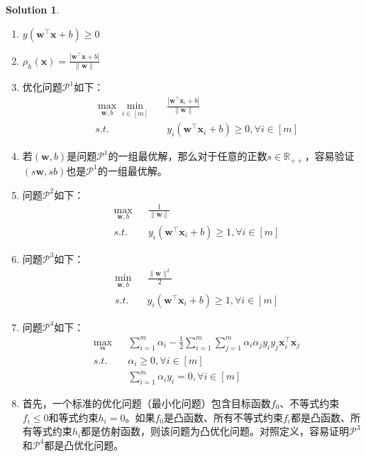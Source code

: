 \documentclass[a4paper,UTF8]{article}
\theoremstyle{definition}
\newtheorem*{solution}{Solution}
\begin{document}
\begin{solution}
\begin{enumerate}[(1)]
\item $y(\mathbf{w}^\top\mathbf{x}+b)\geq 0$
\item $\rho_{h}(\mathbf{x})=\frac{|\mathbf{w}^\top\mathbf{x}+b|}{\|\mathbf{w}\|}$
\item 优化问题$\mathcal{P}^{1}$如下：
\begin{equation}
\begin{aligned}
&\max_{\mathbf{w},b}\min_{i\in[m]}&&\frac{|\mathbf{w}^\top\mathbf{x}_i+b|}{\|\mathbf{w}\|}\\
&s.t.&&y_i(\mathbf{w}^\top\mathbf{x}_i+b)\geq 0,\forall i\in[m]
\end{aligned}
\end{equation}
\item 若$(\mathbf{w},b)$是问题$\mathcal{P}^{1}$的一组最优解，那么对于任意的正数$s\in\mathbb{R}_{++}$，容易验证$(s\mathbf{w},sb)$也是$\mathcal{P}^{1}$的一组最优解。
\item 问题$\mathcal{P}^{2}$如下：
\begin{equation}
\begin{aligned}
&\max_{\mathbf{w},b}&&\frac{1}{\|\mathbf{w}\|}\\
&s.t.&&y_i(\mathbf{w}^\top\mathbf{x}_i+b)\geq 1,\forall i\in[m]
\end{aligned}
\end{equation}
\item 问题$\mathcal{P}^{3}$如下：
\begin{equation}
\begin{aligned}
&\min_{\mathbf{w},b}&&\frac{\|\mathbf{w}\|^2}{2}\\
&s.t.&&y_i(\mathbf{w}^\top\mathbf{x}_i+b)\geq 1,\forall i\in[m]
\end{aligned}
\end{equation}
\item 问题$\mathcal{P}^{4}$如下：
\begin{equation}
\begin{aligned}
&\max_{\bm{\alpha}}&&\sum_{i=1}^{m}\alpha_{i}-\frac{1}{2}\sum_{i=1}^{m}\sum_{j=1}^{m}\alpha_i\alpha_j y_i y_j\mathbf{x}_i^\top\mathbf{x}_j\\
&s.t.&&\alpha_i\geq 0,\forall i\in[m]\\
&&&\sum_{i=1}^{m}\alpha_i y_i=0,\forall i\in[m]
\end{aligned}
\end{equation}
\item 首先，一个标准的优化问题（最小化问题）包含目标函数$f_0$、不等式约束$f_i\leq 0$和等式约束$h_i=0$。如果$f_0$是凸函数、所有不等式约束$f_i$都是凸函数、所有等式约束$h_i$都是仿射函数，则该问题为凸优化问题。对照定义，容易证明$\mathcal{P}^3$和$\mathcal{P}^4$都是凸优化问题。

\end{enumerate}
\end{solution}
\end{document}
